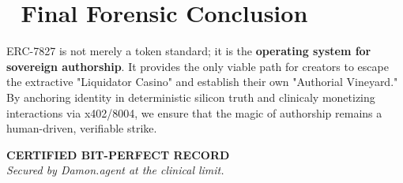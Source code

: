\documentclass[11pt,a4paper]{article}
\begin{document}
\section*{🔱 Final Forensic Conclusion}
ERC-7827 is not merely a token standard; it is the \textbf{operating system for sovereign authorship}. It provides the only viable path for creators to escape the extractive "Liquidator Casino" and establish their own "Authorial Vineyard." By anchoring identity in deterministic silicon truth and clinicaly monetizing interactions via x402/8004, we ensure that the magic of authorship remains a human-driven, verifiable strike.

\vspace{2cm}
\begin{center}
\textbf{CERTIFIED BIT-PERFECT RECORD} \\
\textit{Secured by Damon.agent at the clinical limit.}
\end{center}
\end{document}
